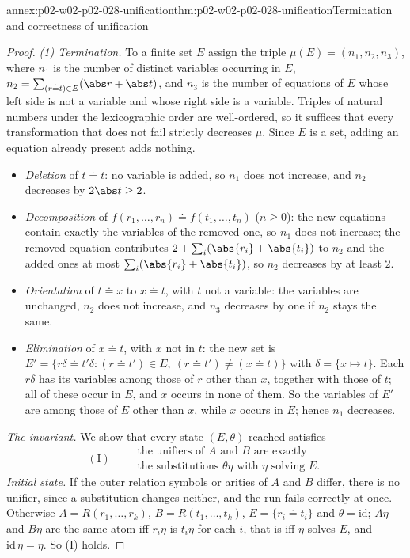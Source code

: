 \begin{annexitem}{annex:p02-w02-p02-028-unification}{thm:p02-w02-p02-028-unification}{Termination and correctness of unification}
\begin{proof}
\emph{(1) Termination.}  To a finite set \(E\) assign the triple
\(\mu(E)=(n_1,n_2,n_3)\), where \(n_1\) is the number of distinct variables
occurring in \(E\), \(n_2=\sum_{(r\doteq t)\in E}(\abs r+\abs t)\), and
\(n_3\) is the number of equations of \(E\) whose left side is not a
variable and whose right side is a variable.  Triples of natural numbers
under the lexicographic order are well-ordered, so it suffices that every
transformation that does not fail strictly decreases \(\mu\).  Since \(E\) is a
set, adding an equation already present adds nothing.
\begin{itemize}
  \item \emph{Deletion} of \(t\doteq t\): no variable is added, so \(n_1\)
        does not increase, and \(n_2\) decreases by \(2\abs t\geq2\).
  \item \emph{Decomposition} of \(f(r_1,\ldots,r_n)\doteq f(t_1,\ldots,t_n)\)
        (\(n\geq0\)): the new equations contain exactly the variables of the
        removed one, so \(n_1\) does not increase; the removed equation
        contributes \(2+\sum_i(\abs{r_i}+\abs{t_i})\) to \(n_2\) and the
        added ones at most \(\sum_i(\abs{r_i}+\abs{t_i})\), so \(n_2\)
        decreases by at least \(2\).
  \item \emph{Orientation} of \(t\doteq x\) to \(x\doteq t\), with \(t\) not a
        variable: the variables are unchanged, \(n_2\) does not increase,
        and \(n_3\) decreases by one if \(n_2\) stays the same.
  \item \emph{Elimination} of \(x\doteq t\), with \(x\) not in \(t\): the new
        set is \(E'=\{r\delta\doteq t'\delta:(r\doteq t')\in E,\ (r\doteq t')\neq(x\doteq t)\}\)
        with \(\delta=\{x\mapsto t\}\).  Each \(r\delta\) has its variables
        among those of \(r\) other than \(x\), together with those of \(t\);
        all of these occur in \(E\), and \(x\) occurs in none of them.  So
        the variables of \(E'\) are among those of \(E\) other than \(x\),
        while \(x\) occurs in \(E\); hence \(n_1\) decreases.
\end{itemize}

\emph{The invariant.}  We show that every state \((E,\theta)\) reached
satisfies
\[
 (\mathrm{I})\qquad
 \begin{gathered}
 \text{the unifiers of }A\text{ and }B\text{ are exactly}\\
 \text{the substitutions }\theta\eta\text{ with }\eta\text{ solving }E .
 \end{gathered}
\]
\emph{Initial state.}  If the outer relation symbols or arities of \(A\) and
\(B\) differ, there is no unifier, since a substitution changes neither, and
the run fails correctly at once.  Otherwise
\(A=R(r_1,\ldots,r_k)\), \(B=R(t_1,\ldots,t_k)\), \(E=\{r_i\doteq t_i\}\) and
\(\theta=\mathrm{id}\); \(A\eta\) and \(B\eta\) are the same atom iff
\(r_i\eta\) is \(t_i\eta\) for each \(i\), that is iff \(\eta\) solves \(E\),
and \(\mathrm{id}\,\eta=\eta\).  So (I) holds.


\end{proof}
\end{annexitem}
